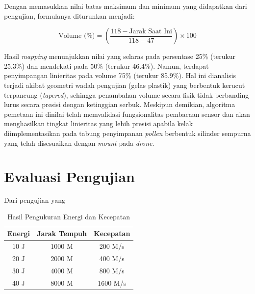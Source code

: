 Dengan memasukkan nilai batas maksimum dan minimum yang didapatkan dari pengujian, formulanya diturunkan menjadi:

\begin{equation}
  \text{Volume (\%)} = \left( \frac{118 - \text{Jarak Saat Ini}}{118 - 47} \right) \times 100
\end{equation}

Hasil \emph{mapping} menunjukkan nilai yang selaras pada persentase 25\% (terukur 25.3\%) dan mendekati pada 50\% (terukur 46.4\%). Namun, terdapat penyimpangan linieritas pada volume 75\% (terukur 85.9\%). Hal ini dianalisis terjadi akibat geometri wadah pengujian (gelas plastik) yang berbentuk kerucut terpancung (\emph{tapered}), sehingga penambahan volume secara fisik tidak berbanding lurus secara presisi dengan ketinggian serbuk. Meskipun demikian, algoritma pemetaan ini dinilai telah memvalidasi fungsionalitas pembacaan sensor dan akan menghasilkan tingkat linieritas yang lebih presisi apabila kelak diimplementasikan pada tabung penyimpanan \emph{pollen} berbentuk silinder sempurna yang telah disesuaikan dengan \emph{mount} pada \emph{drone}.



\section{Evaluasi Pengujian}
\label{sec:analisis-pengujian}

Dari pengujian yang \lipsum[1]

\begin{longtable}{|c|c|c|}
  \caption{Hasil Pengukuran Energi dan Kecepatan}
  \label{tb:energi-kecepatan}                                   \\
  \hline
  \rowcolor[HTML]{C0C0C0}
  \textbf{Energi} & \textbf{Jarak Tempuh} & \textbf{Kecepatan} \\
  \hline
  10 J            & 1000 M                & 200 M/s            \\
  20 J            & 2000 M                & 400 M/s            \\
  30 J            & 4000 M                & 800 M/s            \\
  40 J            & 8000 M                & 1600 M/s           \\
  \hline
\end{longtable}

\lipsum[2-4]

